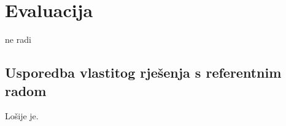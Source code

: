 \chapter{Evaluacija}


ne radi

\section{Usporedba vlastitog rješenja s referentnim radom}

Lošije je.

